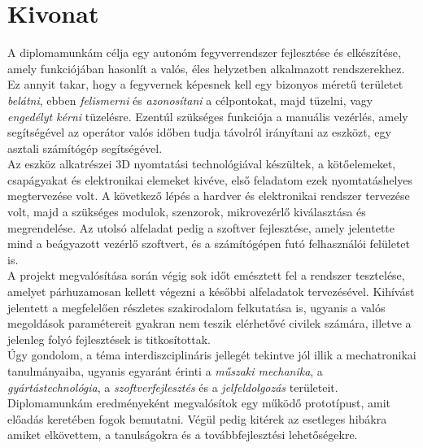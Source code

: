 \setcounter{page}{1}

\selecthungarian

\chapter*{Kivonat}

A diplomamunkám célja egy autonóm fegyverrendszer fejlesztése és elkészítése, amely funkciójában hasonlít a valós, éles helyzetben alkalmazott rendszerekhez. Ez annyit takar, hogy a fegyvernek képesnek kell egy bizonyos méretű területet \textsl{belátni}, ebben \textsl{felismerni} és \textsl{azonosítani} a célpontokat, majd tüzelni, vagy \textsl{engedélyt kérni} tüzelésre. Ezentúl szükséges funkciója a manuális vezérlés, amely segítségével az operátor valós időben tudja távolról irányítani az eszközt, egy asztali számítógép segítségével.\\

Az eszköz alkatrészei 3D nyomtatási technológiával készültek, a kötőelemeket, csapágyakat és elektronikai elemeket kivéve, első feladatom ezek nyomtatáshelyes megtervezése volt. A következő lépés a hardver és elektronikai rendszer tervezése volt, majd a szükséges modulok, szenzorok, mikrovezérlő kiválasztása és megrendelése. Az utolsó alfeladat pedig a szoftver fejlesztése, amely jelentette mind a beágyazott vezérlő szoftvert, és a számítógépen futó felhasználói felületet is.\\

A projekt megvalósítása során végig sok időt emésztett fel a rendszer tesztelése, amelyet párhuzamosan kellett végezni a későbbi alfeladatok tervezésével. Kihívást jelentett a megfelelően részletes szakirodalom felkutatása is, ugyanis a valós megoldások paramétereit gyakran nem teszik elérhetővé civilek számára, illetve a jelenleg folyó fejlesztések is titkosítottak.\\

Úgy gondolom, a téma interdiszciplináris jellegét tekintve jól illik a mechatronikai tanulmányaiba, ugyanis egyaránt érinti a \textsl{műszaki mechanika},  a \textsl{gyártástechnológia}, a \textsl{szoftverfejlesztés} és a \textsl{jelfeldolgozás} területeit.\\

Diplomamunkám eredményeként megvalósítok egy működő prototípust, amit előadás keretében fogok bemutatni. Végül pedig kitérek az esetleges hibákra amiket elkövettem, a tanulságokra és a továbbfejlesztési lehetőségekre.\\

